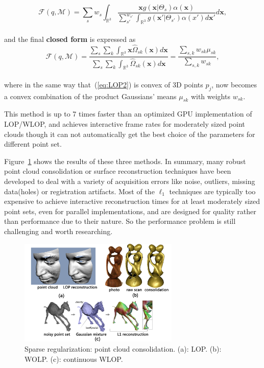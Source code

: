 \small{
\begin{equation}
 \label{eq:CLOP2}
 \mathcal{F}(q,\mathcal{M})=\sum_{s}^{}w_s\int_{\mathbb{R}^3}^{}
 \frac{\mathbf{x}g(\mathbf{x}|\Theta_{s})\alpha(\mathbf{x})}
 {\sum_{s'}^{w_{s'}}\int_{\mathbb{R}^3}^{}g(\mathbf{x'}|\Theta_{s'})\alpha(x')d\mathbf{x}'}
 d\mathbf{x},
\end{equation}
}
\\
and the final \textbf{closed form} is expressed as
\small{
\begin{equation}
 \label{eq:CLOP3}
 \mathcal{F}(q,\mathcal{M})=\frac{\sum_{s}^{}\sum_{k}^{}\int_{\mathbb{R}^3}^{}\mathbf{x}\widehat{\Omega}_{sk}(\mathbf{x})d\mathbf{x}}
 {\sum_{s}^{}\sum_{k}^{}\int_{\mathbb{R}^3}^{}\widehat{\Omega}_{sk}(\mathbf{x})d\mathbf{x}}
 =\frac{\sum_{s,k}^{}w_{sk}\mu_{sk}}
 {\sum_{s,k}^{}w_{sk}},
\end{equation}
}
\\
where in the same way that~(\ref{eq:LOP2}) is convex of 3D points $p_{j}$, now becomes a convex combination of the product Gaussians' means $\mu_{sk}$ with weights $w_{sk}$.

This method is up to 7 times faster than an optimized GPU implementation of LOP/WLOP, and achieves interactive frame rates for moderately sized point clouds though it can not automatically get the best choice of the parameters for different point set.

\vspace{10pt}
Figure~\ref{fig:L1 median consolidation} shows the results of these three methods. In summary, many robust point cloud consolidation or surface reconstruction techniques have been developed to deal with a variety of acquisition errors like noise, outliers, missing data(holes) or registration artifacts.
Most of the $\ell_1$ techniques are typically too expensive to achieve interactive reconstruction times for at least moderately sized point sets, even for parallel implementations,
and are designed for quality rather than performance due to their nature. So the performance problem is still challenging and worth researching.

\begin{figure}[ht]
  \centering
  \includegraphics[width=3in]{images/reconstruction_L1}
  \caption{Sparse regularization: point cloud consolidation. (a): LOP\cite{lipman2007parameterization}. (b): WOLP\cite{huang2009consolidation}. (c): continuous WLOP\cite{preiner2014CPF}.}
  \label{fig:L1 median consolidation}
\end{figure} 